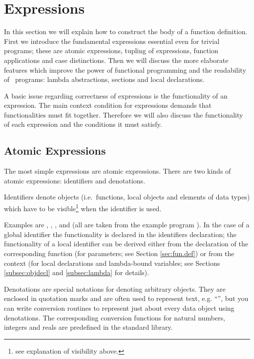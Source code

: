 \section{Expressions}
\label{sec:expr.simple}
\novice 
In this  section we will explain how to construct
the body of a function definition.
First we introduce the fundamental expressions essential even for
trivial programs; these are atomic expressions, tupling of expressions,
function applications and case distinctions. 
Then we will discuss the more elaborate features which improve the
power of  functional programming and the readability of \opal\ 
programs: lambda abstractions, sections and local declarations. 

\medskip
A basic issue regarding correctness of expressions is the
functionality of an expression.
The main context condition for expressions demands that
functionalities must fit together.
Therefore we will also discuss the functionality of each expression
and the conditions it must satisfy.


\subsection{Atomic Expressions}
\label{subsec:atomic}
\novice
The most simple expressions are atomic expressions. 
There are two kinds of atomic expressions: identifiers and
denotations.

Identifiers denote objects (i.e.~functions, local objects  and
elements of data types) which have to be visible\footnote{see
  explanation of visibility above.} when the identifier
is used. 

Examples are , , \pro{=}, \pro{+} and
 (all are taken from the example program
\pro{rabbits}). 
In the case of a global identifier the functionality is
declared in the identifiers declaration; the
functionality of a local identifier can  be derived either from the declaration of the
corresponding function (for parameters; see Section
\ref{sec:fun.def}) or from the context (for local declarations and
lambda-bound variables; see Sections \ref{subsec:objdecl} and \ref{subsec:lambda} for details).

\medskip
Denotations are special notations for denoting arbitrary objects.
They are enclosed in quotation marks and are often used to
represent text, e.g. ``'', but you can write conversion
routines to represent just about every data object using denotations.
The corresponding conversion functions for natural numbers, integers and reals are
predefined in the standard library.

